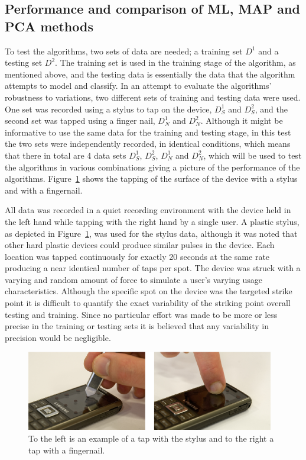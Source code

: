 \subsection{Performance and comparison of ML, MAP and PCA methods}
To test the algorithms, two sets of data are needed; a training set $D^1$ and a testing set $D^2$. The training set is used in the training stage of the algorithm, as mentioned above, and the testing data is essentially the data that the algorithm attempts to model and classify. In an attempt to evaluate the algorithms' robustness to variations, two different sets of training and testing data were used. One set was recorded using a stylus to tap on the device, $D^1_S$ and $D^2_S$, and the second set was tapped using a finger nail, $D^1_N$ and $D^2_N$. Although it might be informative to use the same data for the training and testing stage, in this test the two sets were independently recorded, in identical conditions, which means that there in total are 4 data sets $D^1_S$, $D^2_S$, $D^1_N$ and $D^2_N$, which will be used to test the algorithms in various combinations giving a picture of the performance of the algorithms. Figure~\ref{fig:tapSN} shows the tapping of the surface of the device with a stylus and with a fingernail.

\label{corrections:DSNmethod}All data was recorded in a quiet recording environment with the device held in the left hand while tapping with the right hand by a single user. A plastic stylus, as depicted in Figure~\ref{fig:tapSN}, was used for the stylus data, although it was noted that other hard plastic devices could produce similar pulses in the device. Each location was tapped continuously for exactly 20 seconds at the same rate producing a near identical number of taps per spot. The device was struck with a varying and random amount of force to simulate a user's varying usage characteristics. Although the specific spot on the device was the targeted strike point it is difficult to quantify the exact variability of the striking point overall testing and training. Since no particular effort was made to be more or less precise in the training or testing sets it is believed that any variability in precision would be negligible.

\begin{figure}[!]
\centering
\includegraphics[width=410 px]{tapSN.png}
\caption{To the left is an example of a tap with the stylus and to the right a tap with a fingernail.}\label{fig:tapSN}
\end{figure}

